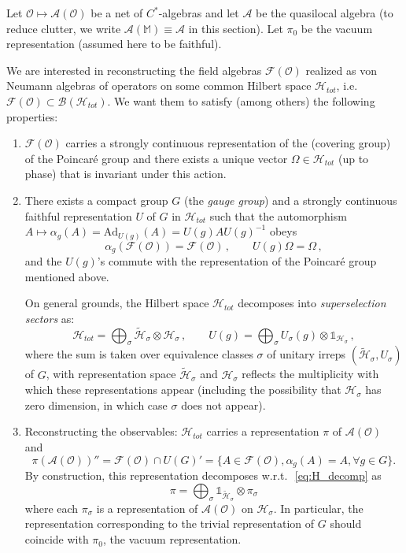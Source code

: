 \documentclass[12pt]{article}
\newcommand{\1}{\mathds{1}}                         %
\newcommand{\M}{\mathbb{M}} 	     %
\newcommand{\Hcal}{\mathcal {H}}
\newcommand{\Bcal}{\mathcal {B}}
\newcommand{\F}{\mathcal{F}}
\newcommand{\Ocal}{\mathcal{O}}
\newcommand{\II}{{\mathbb{1}}}
\newcommand{\Ac}{{\mathcal{A}}}
\newcommand{\Fc}{{\mathcal{F}}}
\begin{document}
Let $\Ocal\mapsto \Ac(\Ocal)$ be a net of $C^*$-algebras
and let $\Ac$ be the quasilocal algebra (to reduce clutter, we write $\Ac(\M)\equiv \Ac$ in this section). Let $\pi_0$ be the vacuum representation (assumed here to be faithful).

We are interested in reconstructing the field algebras $\F(\Ocal)$ realized as von Neumann algebras of operators on some common Hilbert space $\Hcal_{tot}$, i.e. $\F(\Ocal)\subset \Bcal(\Hcal_{tot})$. We want them to satisfy (among others) the following properties:
	\begin{enumerate}[label=\bf F\arabic{enumi},leftmargin=*,widest=4] 
	\item $\F(\Ocal)$ carries a strongly continuous representation of the (covering group) of the Poincar\'e group and there exists a unique vector $\Omega\in \Hcal_{tot}$ (up to  phase) that is invariant under this action.
	\item There exists a compact group $G$ (the \textit{gauge group}) and a strongly continuous faithful representation $U$ of $G$ in  $\Hcal_{tot}$ such that the automorphism $A\mapsto \alpha_g(A)= \mathrm{Ad}_{U(g)}(A)=U(g)A U(g)^{-1}$ obeys
\[
	\alpha_g(\F(\Ocal))=\F(\Ocal)\,,\qquad U(g)\Omega=\Omega\,,
\]
	and the $U(g)$'s commute with the representation of the Poincar\'e group mentioned above.
	
	On general grounds, the Hilbert space $\Hcal_{tot}$ decomposes into \textit{superselection sectors} as:
	\begin{equation}\label{eq:H_decomp}
	\Hcal_{tot}=\bigoplus_\sigma \tilde{\Hcal}_\sigma\otimes \Hcal_\sigma\,,\qquad
	U(g) = \bigoplus_\sigma  U_\sigma(g)\otimes \II_{{\Hcal}_\sigma}\,,
	\end{equation}
	where the sum is taken over equivalence classes $\sigma$ of unitary irreps $(\tilde{\Hcal}_\sigma,U_\sigma)$ of $G$, with representation space $\tilde{\Hcal}_\sigma$ and $\Hcal_\sigma$ reflects the multiplicity with which these representations appear (including the possibility that  $\Hcal_\sigma$ has zero dimension, in which case $\sigma$ does not appear).
	
	\item Reconstructing the observables: $\Hcal_{tot}$ carries a representation $\pi$ of $\Ac(\Ocal)$ and
	\[
	\pi(\Ac(\Ocal))''=\Fc(\Ocal)\cap U(G)' =\{A\in\F(\Ocal), \alpha_g(A)=A, \forall g\in G\}.
	\]
	By construction, this representation decomposes w.r.t.\,~\eqref{eq:H_decomp} as
	\[
	\pi = \bigoplus_\sigma  \II_{\tilde{\Hcal}_\sigma}\otimes \pi_\sigma
	\]
	where each $\pi_\sigma$ is a representation of $\Ac(\Ocal)$ on $\Hcal_\sigma$.
	In particular, the representation corresponding to the trivial representation of $G$ should coincide with $\pi_0$, the vacuum representation.  
\end{enumerate}
\end{document}
